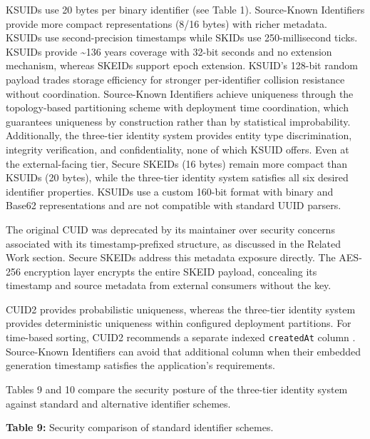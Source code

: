 \documentclass[a4paper,fleqn]{cas-sc}
\newcounter{none}
\begin{document}
KSUIDs \citep{ksuid} use 20 bytes per binary identifier (see Table 1).
Source-Known Identifiers provide more compact representations (8/16
bytes) with richer metadata. KSUIDs use second-precision timestamps
while SKIDs use 250-millisecond ticks. KSUIDs provide \textasciitilde136
years coverage with 32-bit seconds and no extension mechanism, whereas
SKEIDs support epoch extension. KSUID's 128-bit random payload trades
storage efficiency for stronger per-identifier collision resistance
without coordination. Source-Known Identifiers achieve uniqueness
through the topology-based partitioning scheme with deployment time
coordination, which guarantees uniqueness by construction rather than by
statistical improbability. Additionally, the three-tier identity system
provides entity type discrimination, integrity verification, and
confidentiality, none of which KSUID offers. Even at the external-facing
tier, Secure SKEIDs (16 bytes) remain more compact than KSUIDs (20
bytes), while the three-tier identity system satisfies all six desired
identifier properties. KSUIDs use a custom 160-bit format with binary
and Base62 representations and are not compatible with standard UUID
parsers.

The original CUID \citep{cuid-deprecated} was deprecated by its
maintainer over security concerns associated with its timestamp-prefixed
structure, as discussed in the Related Work section. Secure SKEIDs
address this metadata exposure directly. The AES-256 encryption layer
encrypts the entire SKEID payload, concealing its timestamp and source
metadata from external consumers without the key.

CUID2 provides probabilistic uniqueness, whereas the three-tier identity
system provides deterministic uniqueness within configured deployment
partitions. For time-based sorting, CUID2 recommends a separate indexed
\texttt{createdAt} column \citep{cuid2}. Source-Known Identifiers can
avoid that additional column when their embedded generation timestamp
satisfies the application's requirements.

Tables 9 and 10 compare the security posture of the three-tier identity
system against standard and alternative identifier schemes.

\textbf{Table 9:} Security comparison of standard identifier schemes.
\end{document}
